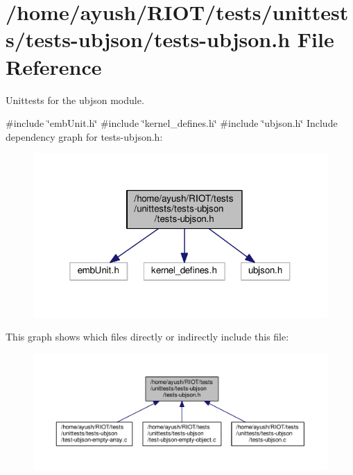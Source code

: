\hypertarget{tests-ubjson_8h}{}\section{/home/ayush/\+R\+I\+O\+T/tests/unittests/tests-\/ubjson/tests-\/ubjson.h File Reference}
\label{tests-ubjson_8h}


Unittests for the {\ttfamily ubjson} module.  


{\ttfamily \#include \char`\"{}emb\+Unit.\+h\char`\"{}}\newline
{\ttfamily \#include \char`\"{}kernel\+\_\+defines.\+h\char`\"{}}\newline
{\ttfamily \#include \char`\"{}ubjson.\+h\char`\"{}}\newline
Include dependency graph for tests-\/ubjson.h\+:
\nopagebreak
\begin{figure}[H]
\begin{center}
\leavevmode
\includegraphics[width=319pt]{tests-ubjson_8h__incl}
\end{center}
\end{figure}
This graph shows which files directly or indirectly include this file\+:
\nopagebreak
\begin{figure}[H]
\begin{center}
\leavevmode
\includegraphics[width=350pt]{tests-ubjson_8h__dep__incl}
\end{center}
\end{figure}
